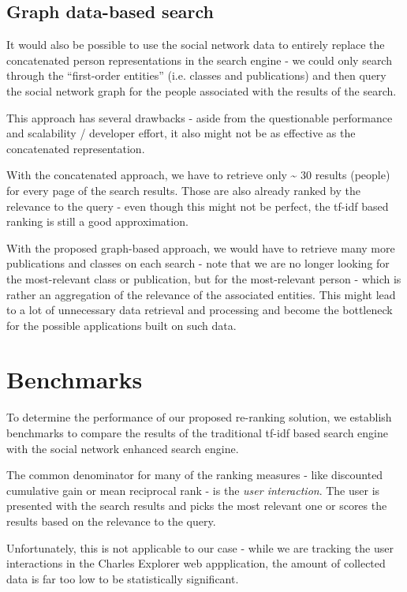 \subsection{Graph data-based search} \label{graph-based-search}

It would also be possible to use the social network data to entirely replace the concatenated person representations in the search engine - we could 
only search through the ``first-order entities'' (i.e. classes and publications) and then query the social network graph for the people associated 
with the results of the search. 

This approach has several drawbacks - aside from the questionable performance and scalability / developer effort, it also might not be as effective as the concatenated representation.

With the concatenated approach, we have to retrieve only \textasciitilde{} 30 results (people) for every page of the search results. 
Those are also already ranked by the relevance to the query - even though this might not be perfect, the tf-idf based ranking is still a good approximation.

With the proposed graph-based approach, we would have to retrieve many more publications and classes on each search - note that we are no longer 
looking for the most-relevant class or publication, but for the most-relevant person - which is rather an aggregation of the relevance of the associated entities.
This might lead to a lot of unnecessary data retrieval and processing and become the bottleneck for the possible applications built on such data.


\section{Benchmarks}

To determine the performance of our proposed re-ranking solution, we establish benchmarks to compare the results of the traditional tf-idf based search engine with the social network enhanced search engine.

The common denominator for many of the ranking measures - like discounted cumulative gain or mean reciprocal rank - is the \textit{user interaction}.
The user is presented with the search results and picks the most relevant one or scores the results based on the relevance to the query.

Unfortunately, this is not applicable to our case - while we are tracking the user interactions in the Charles Explorer web appplication, the amount of collected data is far too low to be statistically significant.

